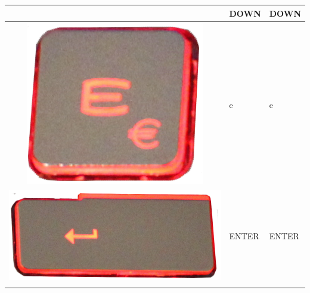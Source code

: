 \begin{longtable}{|cll|}
\begin{minipage}[c]{.4\textwidth}
\vspace{0.2cm}
\end{minipage} & DOWN & DOWN\\
\hline
\begin{minipage}[c]{.4\textwidth}
\vspace{0.2cm}
\includegraphics[scale=0.08]{Images/KeyMapping/e}
\vspace{0.2cm}
\end{minipage} & e & e\\
\hline
\begin{minipage}[c]{.4\textwidth}
\vspace{0.2cm}
\includegraphics[scale=0.08]{Images/KeyMapping/ENTER}
\vspace{0.2cm}
\end{minipage} & ENTER & ENTER\\
\hline
\begin{minipage}[c]{.4\textwidth}
\vspace{0.2cm}

\end{minipage}
\end{longtable}
